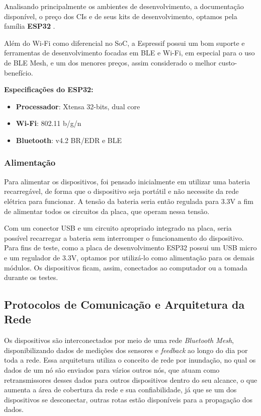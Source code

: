 \documentclass[../monografia.tex]{subfiles}
\begin{document}
Analisando principalmente os ambientes de desenvolvimento, a documentação disponível, o preço dos CIs e de seus kits de desenvolvimento, optamos pela família \textbf{ESP32} \cite{ESP32}. 

Além do Wi-Fi como diferencial no SoC, a Espressif possui um bom suporte e ferramentas de desenvolvimento focadas em BLE e Wi-Fi, em especial para o uso de BLE Mesh, e um dos menores preços, assim considerado o melhor custo-benefício. 

\textbf{Especificações do ESP32:} \cite{ESP-datasheet}
\begin{itemize}
\item \textbf{Processador}: Xtensa 32-bits, dual core
\item \textbf{Wi-Fi}: 802.11 b/g/n
\item \textbf{Bluetooth}: v4.2 BR/EDR e BLE
\end{itemize}



\subsubsection{Alimentação}

Para alimentar os dispositivos, foi pensado inicialmente em utilizar uma bateria recarregável, de forma que o dispositivo seja portátil e não necessite da rede elétrica para funcionar. A tensão da bateria seria então regulada para 3.3V a fim de alimentar todos os circuitos da placa, que operam nessa tensão. 

Com um conector USB e um circuito apropriado integrado na placa, seria possível recarregar a bateria sem interromper o funcionamento do dispositivo. Para fins de teste, como a placa de desenvolvimento ESP32 possui um USB micro e um regulador de 3.3V, optamos por utilizá-lo como alimentação para os demais módulos. Os dispositivos ficam, assim, conectados ao computador ou a tomada durante os testes.

\subsection{Protocolos de Comunicação e Arquitetura da Rede}

Os dispositivos são interconectados por meio de uma rede \textit{Bluetooth Mesh}, disponibilizando dados de medições dos sensores e \textit{feedback} ao longo do dia por toda a rede. Essa arquitetura utiliza o conceito de rede por inundação, no qual os dados de um nó são enviados para vários outros nós, que atuam como retransmissores desses dados para outros dispositivos dentro do seu alcance, o que aumenta a área de cobertura da rede e sua confiabilidade, já que se um dos dispositivos se desconectar, outras rotas estão disponíveis para a propagação dos dados.
\end{document}
